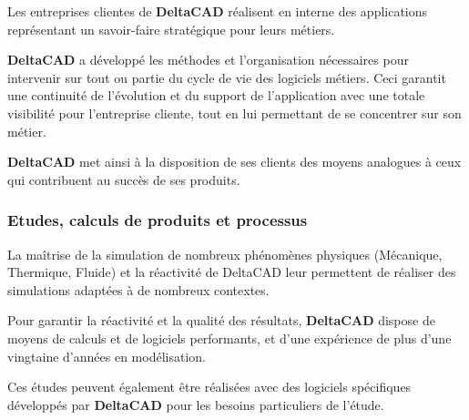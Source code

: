 Les entreprises clientes de \textbf{DeltaCAD} réalisent en interne des applications représentant un savoir-faire stratégique pour leurs métiers.

\textbf{DeltaCAD} a développé les méthodes et l'organisation nécessaires pour intervenir sur tout ou partie du cycle de vie des logiciels métiers. Ceci garantit une continuité de l'évolution et du support de l'application avec une totale visibilité pour l'entreprise cliente, tout en lui  permettant de se concentrer sur son métier.

\textbf{DeltaCAD} met ainsi à la disposition de ses clients des moyens analogues à ceux qui contribuent au succès de ses produits.

\subsubsection{Etudes, calculs de produits et processus}

La maîtrise de la simulation de nombreux phénomènes physiques (Mécanique, Thermique, Fluide) et la réactivité de DeltaCAD leur permettent de réaliser des simulations adaptées à de nombreux contextes.

Pour garantir la réactivité et la qualité des résultats, \textbf{DeltaCAD} dispose de moyens de calculs et de logiciels performants, et d'une expérience de plus d'une vingtaine d'années en modélisation.

Ces études peuvent également être réalisées avec des logiciels spécifiques développés par \textbf{DeltaCAD} pour les besoins particuliers de l'étude.

\clearpage
